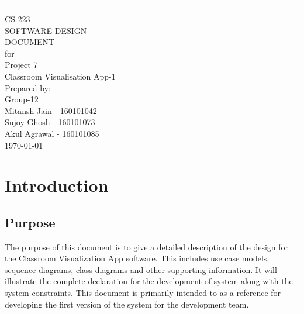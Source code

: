 \documentclass{scrreprt}
\date{}
\title{}
\begin{document}
\begin{flushright}
    \rule{16cm}{5pt}\vskip1cm
    \begin{bfseries}
        \Huge{CS-223\\SOFTWARE DESIGN\\ DOCUMENT}\\
        \vspace{1.5cm}
        for\\
        \vspace{1.5cm}
        Project 7\\
        Classroom Visualisation App-1\\
        
        \vspace{1.9cm}
        \LARGE{Prepared by: }\\
        Group-12\\
        Mitansh Jain - 160101042\\
        Sujoy Ghosh - 160101073\\
        Akul Agrawal - 160101085\\
        \vspace{1.9cm}
        \today\\
    \end{bfseries}
\end{flushright}
\tableofcontents
\listoffigures
\listoftables
\chapter{Introduction}

\section{Purpose}
The purpose of this document is to give a detailed description of the
design for the Classroom Visualization App software. This includes use
case models, sequence diagrams, class diagrams and other supporting
information. It will illustrate the complete declaration for the
development of system along with the system constraints. This document
is primarily intended to as a reference for developing the first version
of the system for the development team.
\end{document}
